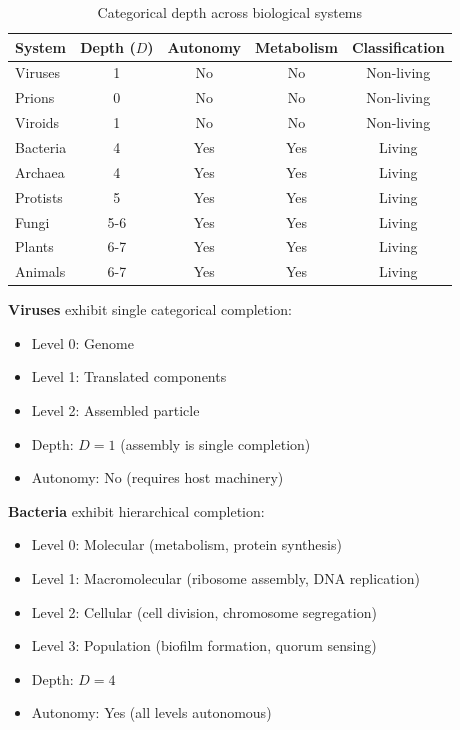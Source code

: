 \documentclass[11pt]{article}
\begin{document}
\begin{table}[h]
\centering
\caption{Categorical depth across biological systems}
\label{tab:categorical_depth}
\begin{tabular}{lcccc}
\hline
\textbf{System} & \textbf{Depth ($D$)} & \textbf{Autonomy} & \textbf{Metabolism} & \textbf{Classification} \\
\hline
Viruses & 1 & No & No & Non-living \\
Prions & 0 & No & No & Non-living \\
Viroids & 1 & No & No & Non-living \\
Bacteria & 4 & Yes & Yes & Living \\
Archaea & 4 & Yes & Yes & Living \\
Protists & 5 & Yes & Yes & Living \\
Fungi & 5-6 & Yes & Yes & Living \\
Plants & 6-7 & Yes & Yes & Living \\
Animals & 6-7 & Yes & Yes & Living \\
\hline
\end{tabular}
\end{table}

\textbf{Viruses} exhibit single categorical completion:
\begin{itemize}
\item Level 0: Genome
\item Level 1: Translated components
\item Level 2: Assembled particle
\item Depth: $D = 1$ (assembly is single completion)
\item Autonomy: No (requires host machinery)
\end{itemize}

\textbf{Bacteria} exhibit hierarchical completion:
\begin{itemize}
\item Level 0: Molecular (metabolism, protein synthesis)
\item Level 1: Macromolecular (ribosome assembly, DNA replication)
\item Level 2: Cellular (cell division, chromosome segregation)
\item Level 3: Population (biofilm formation, quorum sensing)
\item Depth: $D = 4$
\item Autonomy: Yes (all levels autonomous)
\end{itemize}
\end{document}
